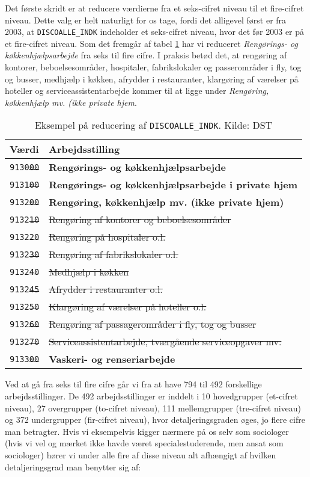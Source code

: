 Det første skridt er at reducere værdierne fra et seks-cifret niveau til et fire-cifret niveau. Dette valg er helt naturligt for os tage, fordi det alligevel først er fra 2003, at \texttt{DISCOALLE\_INDK} indeholder et seks-cifret niveau, hvor det før 2003 er på et fire-cifret niveau. Som det fremgår af tabel \ref{tab_reducering} har vi reduceret \emph{Rengørings- og køkkenhjælpsarbejde} fra seks til fire cifre. I praksis betød det, at rengøring af kontorer, beboelsesområder, hospitaler, fabrikslokaler og passerområder i fly, tog og busser, medhjælp i køkken, afrydder i restauranter, klargøring af værelser på hoteller og serviceassistentarbejde kommer til at ligge under \emph{Rengøring, køkkenhjælp mv. (ikke private hjem}.
% 
\begin{table}[H] \centering
\caption{Eksempel på reducering af \texttt{DISCOALLE\_INDK}. Kilde: DST}
\label{tab_reducering}
\begin{tabular}{@{}ll@{}} \toprule
Værdi  & Arbejdsstilling \\ \midrule
  \texttt{9130\sout{00}} & \textbf{Rengørings- og køkkenhjælpsarbejde} \\ \hline
  \texttt{9131\sout{00}} & \textbf{Rengørings- og køkkenhjælpsarbejde i private hjem} \\ \hline
  \texttt{9132\sout{00}} & \textbf{Rengøring, køkkenhjælp mv. (ikke private hjem)} \\ 
  \texttt{9132\sout{10}} & \sout{Rengøring af kontorer og beboelsesområder} \\ 
  \texttt{9132\sout{20}} & \sout{Rengøring på hospitaler o.l.} \\ 
  \texttt{9132\sout{30}} & \sout{Rengøring af fabrikslokaler o.l.} \\ 
  \texttt{9132\sout{40}} & \sout{Medhjælp i køkken} \\ 
  \texttt{9132\sout{45}} & \sout{Afrydder i restauranter o.l.} \\ 
  \texttt{9132\sout{50}} & \sout{Klargøring af værelser på hoteller o.l.} \\ 
  \texttt{9132\sout{60}} & \sout{Rengøring af passagerområder i fly, tog og busser} \\ 
  \texttt{9132\sout{70}} & \sout{Serviceassistentarbejde, tværgående serviceopgaver mv.} \\ \hline
  \texttt{9133\sout{00}} & \textbf{Vaskeri- og renseriarbejde} \\ \bottomrule
\end{tabular} \end{table}
% 
Ved at gå fra seks til fire cifre går vi fra at have 794 til 492 forskellige arbejdsstillinger. De 492 arbejdsstillinger er inddelt i 10 hovedgrupper (et-cifret niveau), 27 overgrupper (to-cifret niveau), 111 mellemgrupper (tre-cifret niveau) og 372 undergrupper (fir-cifret niveau), hvor detaljeringsgraden øges, jo flere cifre man betragter. Hvis vi eksempelvis kigger nærmere på os selv som sociologer (hvis vi vel og mærket ikke havde været specialestuderende, men ansat som sociologer) hører vi under alle fire af disse niveau alt afhængigt af hvilken detaljeringsgrad man benytter sig af:
